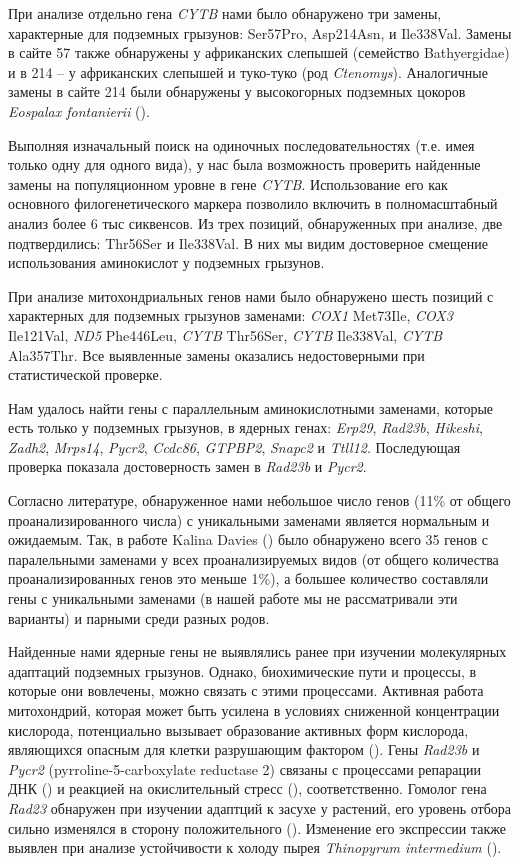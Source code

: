 При анализе отдельно гена \textit{CYTB} нами было обнаружено три замены, характерные для подземных грызунов: Ser57Pro, Asp214Asn, и Ile338Val. Замены в сайте 57 также обнаружены у африканских слепышей (семейство Bathyergidae) и в 214 -- у африканских слепышей и туко-туко (род \textit{Ctenomys}). Аналогичные замены в сайте 214 были обнаружены у высокогорных подземных цокоров \textit{Eospalax fontanierii} (\cite{Cooper1993}). 

Выполняя изначальный поиск на одиночных последовательностях (т.е. имея только одну для одного вида), у нас была возможность проверить найденные замены на популяционном уровне в гене \textit{CYTB}. Использование его как основного филогенетического маркера позволило включить в полномасштабный анализ более 6 тыс сиквенсов. Из трех позиций, обнаруженных при анализе, две подтвердились: Thr56Ser и Ile338Val. В них мы видим достоверное смещение использования аминокислот у подземных грызунов.

При анализе митохондриальных генов нами было обнаружено шесть позиций с характерных для подземных грызунов заменами: \textit{COX1} Met73Ile, \textit{COX3} Ile121Val, \textit{ND5} Phe446Leu, \textit{CYTB} Thr56Ser, \textit{CYTB} Ile338Val, \textit{CYTB} Ala357Thr. Все выявленные замены оказались недостоверными при статистической проверке. 

Нам удалось найти гены с параллельным аминокислотными заменами, которые есть только у подземных грызунов, в ядерных генах: \textit{Erp29}, \textit{Rad23b}, \textit{Hikeshi}, \textit{Zadh2}, \textit{Mrps14}, \textit{Pycr2}, \textit{Ccdc86}, \textit{GTPBP2}, \textit{Snapc2} и \textit{Ttll12}. Последующая проверка показала достоверность замен в \textit{Rad23b} и \textit{Pycr2}.

Согласно литературе, обнаруженное нами небольшое число генов (11\% от общего проанализированного числа) с уникальными заменами  является нормальным и ожидаемым. Так, в работе Kalina Davies (\cite{Davies2018}) было обнаружено всего 35 генов с паралельными заменами у всех проанализируемых видов (от общего количества проанализированных генов это меньше 1\%), а большее количество составляли гены с уникальными заменами (в нашей работе мы не рассматривали эти варианты) и парными среди разных родов. 

Найденные нами ядерные гены не выявлялись ранее при изучении молекулярных адаптаций подземных грызунов. Однако, биохимические пути и процессы, в которые они вовлечены, можно связать с этими процессами. Активная работа митохондрий, которая может быть усилена в условиях сниженной концентрации кислорода, потенциально вызывает образование активных форм кислорода, являющихся опасным для клетки разрушающим фактором (\cite{Turrens2003}). Гены \textit{Rad23b} и \textit{Pycr2} (pyrroline-5-carboxylate reductase 2) связаны с процессами репарации ДНК (\cite{Pohjoismaki2012}) и реакцией на окислительный стресс (\cite{Kuo2015}), соответственно. Гомолог гена \textit{Rad23} обнаружен при изучении адаптций к засухе у растений, его уровень отбора сильно изменялся в сторону положительного (\cite{Zhang2013b}). Изменение его экспрессии также выявлен при анализе устойчивости к холоду пырея \textit{Thinopyrum intermedium} (\cite{Jaikumar2020}). 

